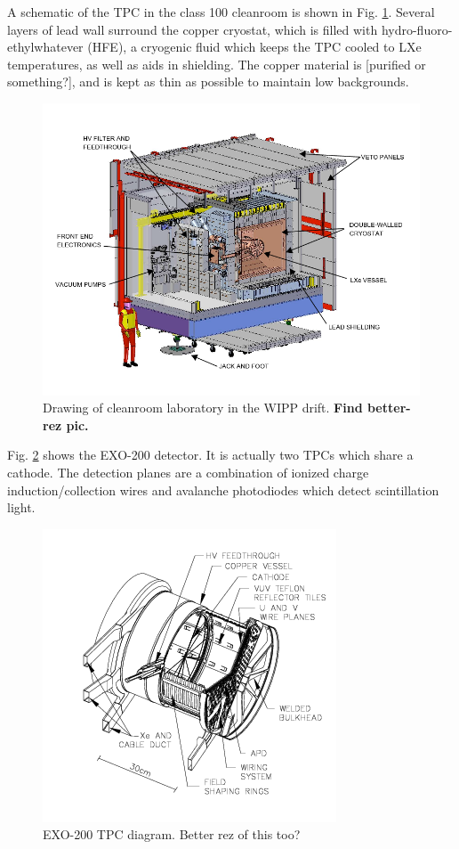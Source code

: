 A schematic of the TPC in the class 100 cleanroom is shown in Fig. \ref{fig:cleanroom}.  Several layers of lead wall surround the copper cryostat, which is filled with hydro-fluoro-ethylwhatever (HFE), a cryogenic fluid which keeps the TPC cooled to LXe temperatures, as well as aids in shielding.  The copper material is [purified or something?], and is kept as thin as possible to maintain low backgrounds.

\begin{figure}[H]
	\centering
	\includegraphics[width=.7\textwidth]{figures/cleanroom.png}
	\caption{Drawing of cleanroom laboratory in the WIPP drift.  \textbf{\color{red} Find better-rez pic.}}
\label{fig:cleanroom}
\end{figure}

Fig. \ref{fig:tpc} shows the EXO-200 detector.  It is actually two TPCs which share a cathode.  The detection planes are a combination of ionized charge induction/collection wires and avalanche photodiodes which detect scintillation light.

\begin{figure}[H]
	\centering
	\includegraphics[width=.7\textwidth]{figures/TPC.png}
	\caption{EXO-200 TPC diagram.  {\color{red}Better rez of this too?}}
\label{fig:tpc}
\end{figure}

